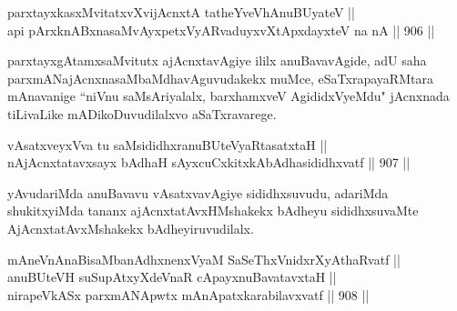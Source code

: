 \begin{shl}
parxtayxkasxMvitatxvXvijAcnxtA tatheYveVhAnuBUyateV || \\
api pArxknABxnasaMvAyxpetxVyARvaduyxvXtApxdayxteV  na nA \hfill || 906 ||  
\end{shl}

\begin{artha}
parxtayxgAtamxsaMvitutx ajAcnxtavAgiye ililx anuBavavAgide, adU saha parxmANajAcnxnasaMbaMdhavAguvudakekx muMce, eSaTxrapayaRMtara mAnavanige ``niVnu saMsAriyalalx, barxhamxveV AgididxVyeMdu" jAcnxnada tiLivaLike mADikoDuvudilalxvo aSaTxravarege.
\end{artha}


\begin{shl}
vAsatxveyxVva tu saMsididhxranuBUteVyaRtasatxtaH || \\
nAjAcnxtatavxsayx bAdhaH sAyxcuCxkitxkAbAdhasididhxvatf \hfill || 907 ||  
\end{shl}

\begin{artha}
yAvudariMda anuBavavu vAsatxvavAgiye sididhxsuvudu, adariMda shukitxyiMda tananx ajAcnxtatAvxHMshakekx bAdheyu sididhxsuvaMte AjAcnxtatAvxMshakekx bAdheyiruvudilalx.
\end{artha}

\begin{shl}
mAneVnAnaBisaMbanAdhxnenxVyaM SaSeThxVnidxrXyAthaRvatf || \\
anuBUteVH suSupAtxyXdeVnaR cApayxnuBavatavxtaH || \\
nirapeVkASx parxmANApwtx mAnApatxkarabilavxvatf \hfill || 908 ||  
\end{shl}

